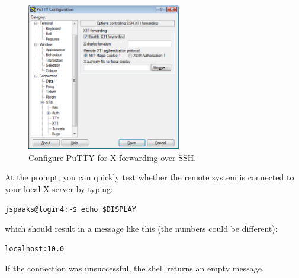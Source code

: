 \begin{figure}[htb]
  \centering
    \includegraphics[width=0.6\textwidth]{./../eps/putty-x-forwarding.eps}
  \caption{Configure PuTTY for X forwarding over SSH.}
  \label{fig:putty-x-forwarding}
\end{figure}

At the prompt, you can quickly test whether the remote system is connected to your local X server by typing:
\begin{lstlisting}[style=basic,style=bash]
jspaaks@login4:~$ echo $DISPLAY
\end{lstlisting}%
which should result in a message like this (the numbers could be different):
\begin{lstlisting}[style=basic,style=bash]
localhost:10.0
\end{lstlisting}
If the connection was unsuccessful, the shell returns an empty message.

